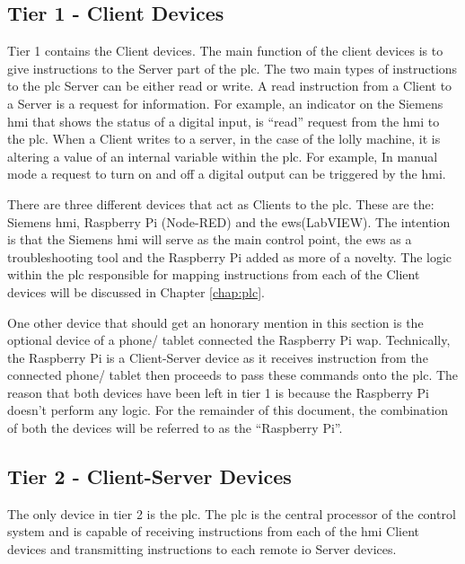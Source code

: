        \subsection{Tier 1 - Client Devices}

        Tier 1 contains the Client devices. The main function of the client devices is to give instructions to the Server part of the \acrshort{plc}. The two main types of instructions to the \acrshort{plc} Server can be either read or write. A read instruction from a Client to a Server is a request for information. For example, an indicator on the Siemens \acrshort{hmi} that shows the status of a digital input, is “read” request from the \acrshort{hmi} to the \acrshort{plc}. When a Client writes to a server, in the case of the lolly machine, it is altering a value of an internal variable within the \acrshort{plc}. For example, In manual mode a request to turn on and off a digital output can be triggered by the \acrshort{hmi}.

        There are three different devices that act as Clients to the \acrshort{plc}. These are the: Siemens \acrshort{hmi}, Raspberry Pi (Node-RED) and the \acrshort{ews}(LabVIEW). The intention is that the Siemens \acrshort{hmi} will serve as the main control point, the \acrshort{ews} as a troubleshooting tool and the Raspberry Pi added as more of a novelty. The logic within the \acrshort{plc} responsible for mapping instructions from each of the Client devices will be discussed in Chapter \ref{chap:plc}.

        One other device that should get an honorary mention in this section is the optional device of a  phone/ tablet connected the Raspberry Pi \acrshort{wap}. Technically, the Raspberry Pi is a Client-Server device as it receives instruction from the connected phone/ tablet then proceeds to pass these commands onto the \acrshort{plc}. The reason that both devices have been left in tier 1 is because the Raspberry Pi doesn't perform any logic. For the remainder of this document, the combination of both the devices will be referred to as the “Raspberry Pi”.

        \subsection{Tier 2 - Client-Server Devices}

        The only device in tier 2 is the \acrshort{plc}. The \acrshort{plc} is the central processor of the control system and is capable of receiving instructions from each of the \acrshort{hmi} Client devices and transmitting instructions to each remote \acrshort{io} Server devices. 

